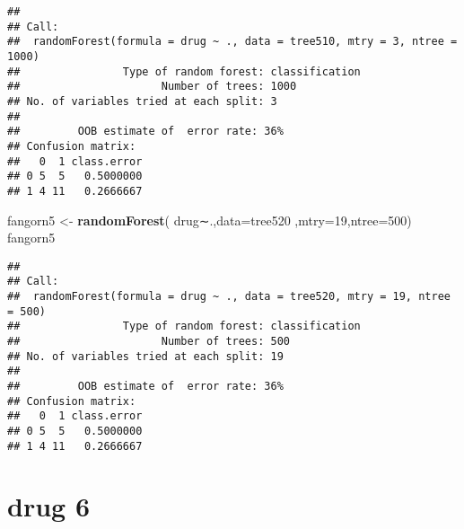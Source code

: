 \documentclass[]{article}
\newenvironment{Shaded}{\begin{snugshade}}{\end{snugshade}}
\newcommand{\KeywordTok}[1]{\textcolor[rgb]{0.13,0.29,0.53}{\textbf{#1}}}
\newcommand{\DataTypeTok}[1]{\textcolor[rgb]{0.13,0.29,0.53}{#1}}
\newcommand{\DecValTok}[1]{\textcolor[rgb]{0.00,0.00,0.81}{#1}}
\newcommand{\StringTok}[1]{\textcolor[rgb]{0.31,0.60,0.02}{#1}}
\newcommand{\CommentTok}[1]{\textcolor[rgb]{0.56,0.35,0.01}{\textit{#1}}}
\newcommand{\OperatorTok}[1]{\textcolor[rgb]{0.81,0.36,0.00}{\textbf{#1}}}
\newcommand{\NormalTok}[1]{#1}
\begin{document}
\begin{verbatim}
## 
## Call:
##  randomForest(formula = drug ~ ., data = tree510, mtry = 3, ntree = 1000) 
##                Type of random forest: classification
##                      Number of trees: 1000
## No. of variables tried at each split: 3
## 
##         OOB estimate of  error rate: 36%
## Confusion matrix:
##   0  1 class.error
## 0 5  5   0.5000000
## 1 4 11   0.2666667
\end{verbatim}

\begin{Shaded}
\begin{Highlighting}[]
\NormalTok{fangorn5 <-}\StringTok{ }\KeywordTok{randomForest}\NormalTok{( drug∼.,}\DataTypeTok{data=}\NormalTok{tree520  ,}\DataTypeTok{mtry=}\DecValTok{19}\NormalTok{,}\DataTypeTok{ntree=}\DecValTok{500}\NormalTok{)}
\NormalTok{fangorn5}
\end{Highlighting}
\end{Shaded}

\begin{verbatim}
## 
## Call:
##  randomForest(formula = drug ~ ., data = tree520, mtry = 19, ntree = 500) 
##                Type of random forest: classification
##                      Number of trees: 500
## No. of variables tried at each split: 19
## 
##         OOB estimate of  error rate: 36%
## Confusion matrix:
##   0  1 class.error
## 0 5  5   0.5000000
## 1 4 11   0.2666667
\end{verbatim}

\section{drug 6}\label{drug-6}

\begin{Shaded}
\end{Shaded}
\end{document}

